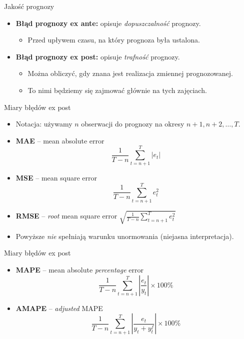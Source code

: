\documentclass[11pt,usenames,dvipsnames,aspectratio=169]{beamer}
\begin{document}
\begin{frame}{Jakość prognozy}
\begin{itemize}
    \item \textbf{Błąd prognozy ex ante:} opisuje \emph{dopuszczalność} prognozy.
    \begin{itemize}
        \item Przed upływem czasu, na który prognoza była ustalona.
    \end{itemize}
    \item \textbf{Błąd prognozy ex post:} opisuje \emph{trafność} prognozy.
    \begin{itemize}
        \item Można obliczyć, gdy znana jest realizacja zmiennej prognozowanej.
        \item To nimi będziemy się zajmować głównie na tych zajęciach.
    \end{itemize}
\end{itemize}
\end{frame}

\begin{frame}{Miary błędów ex post}
\small
\begin{itemize}
    \item Notacja: używamy $n$ obserwacji do prognozy na okresy $n+1,n+2,\ldots,T$.
    \item \textbf{MAE} -- mean absolute error
    \[
    \frac{1}{T-n}\sum_{t=n+1}^{T}\left|e_{t}\right|
    \]
    \item \textbf{MSE} -- mean square error
    \[
    \frac{1}{T-n}\sum_{t=n+1}^{T}e_{t}^{2}
    \]
    \item \textbf{RMSE} -- \emph{root} mean square error
    $\displaystyle\sqrt{\frac{1}{T-n}\sum_{t=n+1}^{T}e_{t}^{2}}$
    \item Powyższe \emph{nie} spełniają warunku unormowania (niejasna interpretacja).
\end{itemize}
\end{frame}

\begin{frame}{Miary błędów ex post}
\begin{itemize}
    \item \textbf{MAPE} -- mean absolute \emph{percentage} error
    \[
    \frac{1}{T-n}\sum_{t=n+1}^{T}\left|\frac{e_{t}}{y_{t}}\right|\times 100\%
    \]
    \item \textbf{AMAPE} -- \emph{adjusted} MAPE
    \[
    \frac{1}{T-n}\sum_{t=n+1}^{T}\left|\frac{e_{t}}{y_{t}+y_{t}^{f}}\right|\times 100\%
    \]
\end{itemize}
\end{frame}
\end{document}
